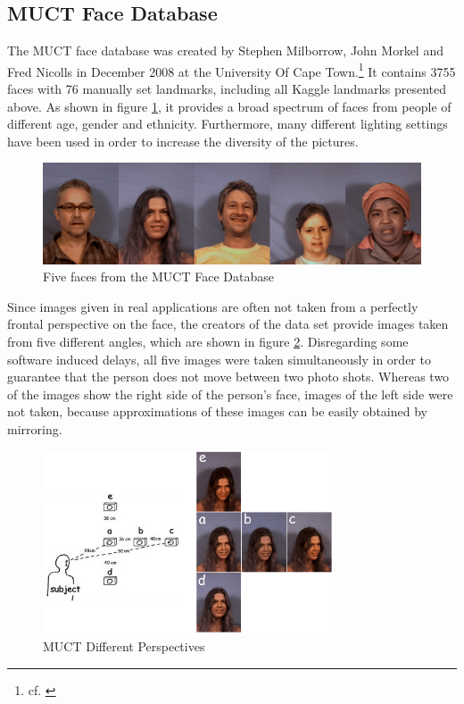 \documentclass[11pt, a4paper]{article}
\begin{document}
\begin{itemize}
\subsection{MUCT Face Database}

The \acf{MUCT} face database was created by Stephen Milborrow, John Morkel and Fred Nicolls in December 2008 at the University Of Cape Town.\footnote{cf. \cite{muct}} It contains 3755 faces with 76 manually set landmarks, including all Kaggle landmarks presented above. As shown in figure \ref{fig:muctfaces}, it provides a broad spectrum of faces from people of different age, gender and ethnicity. Furthermore, many different lighting settings have been used in order to increase the diversity of the pictures.

\begin{figure}[htbp]
	\centering
	\includegraphics[width=\textwidth]{muct_faces.png}
	\caption{Five faces from the MUCT Face Database}
	\label{fig:muctfaces}
\end{figure}

Since images given in real applications are often not taken from a perfectly frontal perspective on the face, the creators of the data set provide images taken from five different angles, which are shown in figure \ref{fig:muctangles}. Disregarding some software induced delays, all five images were taken simultaneously in order to guarantee that the person does not move between two photo shots. Whereas two of the images show the right side of the person's face, images of the left side were not taken, because approximations of these images can be easily obtained by mirroring.

\begin{figure}[htbp]
	\centering
	\includegraphics[width=0.77\textwidth]{muct_perspectives.png}
	\caption[MUCT Different Perspectives]{MUCT Different Perspectives\footnotemark}
	\label{fig:muctangles}
\end{figure}


\end{itemize}
\end{document}
